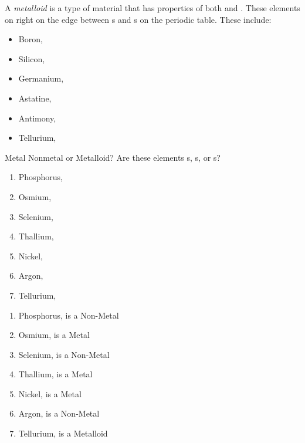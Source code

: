 \begin{definition}[Metalloid] \label{def:Metalloid}
  A \emph{metalloid} is a type of material that has properties of both  and .
  These elements on right on the edge between s and s on the periodic table.
  These include:
  \begin{itemize}[noitemsep, nolistsep]
    \item Boron, 
    \item Silicon, 
    \item Germanium, 
    \item Astatine, 
    \item Antimony, 
    \item Tellurium, 
  \end{itemize}
\end{definition}

\begin{example}[]{Metal Nonmetal or Metalloid?}
  Are these elements s, s, or s?
  \begin{enumerate}
    \item Phosphorus, 
    \item Osmium, 
    \item Selenium, 
    \item Thallium, 
    \item Nickel, 
    \item Argon, 
    \item Tellurium, 
  \end{enumerate}
  
  \tcblower
  
  \begin{enumerate}
    \item Phosphorus,  is a Non-Metal
    \item Osmium,  is a Metal
    \item Selenium,  is a Non-Metal
    \item Thallium,  is a Metal
    \item Nickel,  is a Metal
    \item Argon,  is a Non-Metal
    \item Tellurium,  is a Metalloid
  \end{enumerate}
\end{example}
